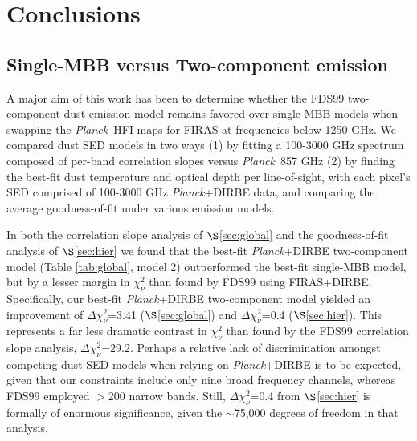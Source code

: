 \documentclass{emulateapj}
\newcommand{\PLANCK}{{\it Planck}}
\begin{document}
\begin{figure*} [ht]
\begin{center}
\caption{\label{fig:results} (top) Hot dust temperature derived from our 
full-resolution two-component model fits of \PLANCK~217-857 GHz and SFD 
100$\mu$m, downbinned to 27.5$'$ resolution. (bottom) Corresponding full-sky 
map of best-fit two-component 545 GHz optical depth.}
\end{center}
\end{figure*}

\section{Conclusions}
\label{sec:conclusion}

\subsection{Single-MBB versus Two-component emission}
A major aim of this work has been to determine whether the  FDS99 two-component
dust emission model remains favored over single-MBB models when swapping the 
\PLANCK~HFI maps for FIRAS at frequencies below 1250 GHz. We compared dust SED 
models in two ways (1) by fitting a 100-3000 GHz spectrum composed of per-band 
correlation slopes versus \PLANCK~857 GHz (2) by finding the best-fit dust 
temperature and optical depth per line-of-sight, with each pixel's SED 
comprised of 100-3000 GHz \PLANCK+DIRBE data, and comparing the average 
goodness-of-fit under various emission models.

In both the correlation slope analysis of $\S$\ref{sec:global} and the 
goodness-of-fit analysis of $\S$\ref{sec:hier} we found that the best-fit 
\PLANCK+DIRBE two-component model (Table \ref{tab:global}, model 2) 
outperformed the best-fit single-MBB model, but by a lesser margin in 
$\chi^2_{\nu}$ than found by FDS99 using FIRAS+DIRBE. Specifically, our 
best-fit \PLANCK+DIRBE two-component model yielded an improvement of 
$\Delta \chi^2_{\nu}$=3.41 ($\S$\ref{sec:global}) and $\Delta \chi^2_{\nu}$=0.4
($\S$\ref{sec:hier}). This represents a far less dramatic contrast in 
$\chi^2_{\nu}$ than found by the FDS99 correlation slope analysis, 
$\Delta \chi^2_{\nu}$=29.2. Perhaps a relative lack of discrimination amongst 
competing dust SED models when relying on \PLANCK+DIRBE is to be expected, 
given that our constraints include only nine broad frequency channels, whereas 
FDS99 employed $>$200 narrow bands. Still, $\Delta \chi^2_{\nu}$=0.4 from 
$\S$\ref{sec:hier} is formally of enormous significance, given the $\sim$75,000
degrees of freedom in that analysis.
\end{document}
